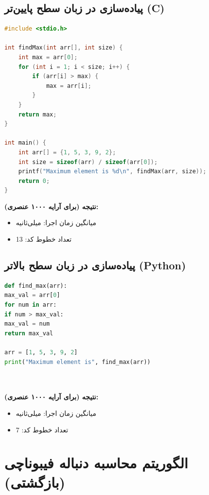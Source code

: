 \documentclass[12pt, a4paper]{report}
\begin{document}
\subsection{پیاده‌سازی در زبان سطح پایین‌تر (C)}

\begin{LTR}
	\begin{lstlisting}[language=C, breaklines=true]
#include <stdio.h>

int findMax(int arr[], int size) {
	int max = arr[0];
	for (int i = 1; i < size; i++) {
		if (arr[i] > max) {
			max = arr[i];
		}
	}
	return max;
}

int main() {
	int arr[] = {1, 5, 3, 9, 2};
	int size = sizeof(arr) / sizeof(arr[0]);
	printf("Maximum element is %d\n", findMax(arr, size));
	return 0;
}

	\end{lstlisting}
\end{LTR}

\textbf{نتیجه (برای آرایه ۱۰۰۰ عنصری):}
\begin{itemize}
	\item میانگین زمان اجرا: \textnormal{} میلی‌ثانیه
	\item تعداد خطوط کد: \textnormal{13}
\end{itemize}


\subsection{پیاده‌سازی در زبان سطح بالاتر (Python)}
\begin{LTR}
	\begin{lstlisting}[language=Python, breaklines=true]
def find_max(arr):
max_val = arr[0]
for num in arr:
if num > max_val:
max_val = num
return max_val

arr = [1, 5, 3, 9, 2]
print("Maximum element is", find_max(arr))

		
	\end{lstlisting}
\end{LTR}

\textbf{نتیجه (برای آرایه ۱۰۰۰ عنصری):}
\begin{itemize}
	\item میانگین زمان اجرا: \textnormal{} میلی‌ثانیه
	\item تعداد خطوط کد: \textnormal{7}
\end{itemize}


\section{الگوریتم محاسبه دنباله فیبوناچی (بازگشتی)}
\end{document}
